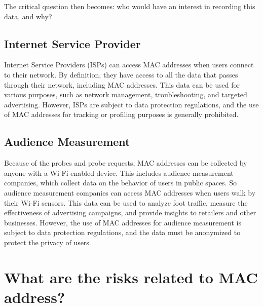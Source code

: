 \documentclass{article}
\begin{document}
  The critical question then becomes: who would have an interest in recording this data, and why? 

  \subsection{\label{subsec:ISP}Internet Service Provider}
  Internet Service Providers (ISPs) can access MAC addresses when users connect to their network.
  By definition, they have access to all the data that passes through their network, including MAC addresses.
  This data can be used for various purposes, such as network management, troubleshooting, 
  and targeted advertising. However, ISPs are subject to data protection regulations,
  and the use of MAC addresses for tracking or profiling purposes is generally prohibited.

  \subsection{\label{subsec:Audience}Audience Measurement}
  Because of the probes and probe requests, MAC addresses can be collected by anyone with a Wi-Fi-enabled device.
  This includes audience measurement companies, which collect data on the behavior of users in public spaces.
  So audience measurement companies can access MAC addresses when users walk by their Wi-Fi sensors.
  This data can be used to analyze foot traffic, measure the effectiveness of advertising campaigns,
  and provide insights to retailers and other businesses. However, the use of MAC addresses for audience measurement
  is subject to data protection regulations, and the data must be anonymized to protect the privacy of users.


\section{\label{sec:Risks}What are the risks related to MAC address?}
\end{document}
